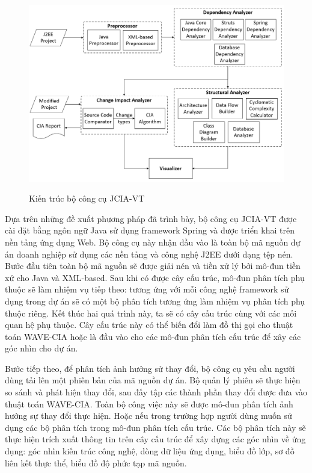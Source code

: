 \documentclass[12pt]{report}
\begin{document}
\begin{figure}[h]
	\centering
	\includegraphics[scale=0.7]{jcia-vt-architecture}
	\label{fig:jcia-vt-architecture}
	\caption{Kiến trúc bộ công cụ JCIA-VT}
\end{figure}

Dựa trên những đề xuất phương pháp đã trình bày, bộ công cụ JCIA-VT được cài đặt bằng ngôn ngữ Java sử dụng framework Spring và được triển khai trên nền tảng ứng dụng Web. Bộ công cụ này nhận đầu vào là toàn bộ mã nguồn dự án doanh nghiệp sử dụng các nền tảng và công nghệ J2EE dưới dạng tệp nén. Bước đầu tiên toàn bộ mã nguồn sẽ được giải nén và tiền xử lý bởi mô-đun tiền xử cho Java và XML-based. Sau khi có được cây cấu trúc, mô-đun phân tích phụ thuộc sẽ làm nhiệm vụ tiếp theo: tương ứng với mỗi công nghệ framework sử dụng trong dự án sẽ có một bộ phân tích tương ứng làm nhiệm vụ phân tích phụ thuộc riêng. Kết thúc hai quá trình này, ta sẽ có cây cấu trúc cùng với các mối quan hệ phụ thuộc. Cây cấu trúc này có thể biến đổi làm đồ thị gọi cho thuật toán WAVE-CIA hoặc là đầu vào cho các mô-đun phân tích cấu trúc để xây các góc nhìn cho dự án.

Bước tiếp theo, để phân tích ảnh hưởng sử thay đổi, bộ công cụ yêu cầu người dùng tải lên một phiên bản của mã nguồn dự án. Bộ quản lý phiên sẽ thực hiện so sánh và phát hiện thay đổi, sau đấy tập các thành phần thay đổi được đưa vào thuật toán WAVE-CIA. Toàn bộ công việc này sẽ được mô-đun phân tích ảnh hưởng sự thay đổi thực hiện. Hoặc nếu trong trường hợp người dùng muốn sử dụng các bộ phân tích trong mô-đun phân tích cấu trúc. Các bộ phân tích này sẽ thực hiện trích xuất thông tin trên cây cấu trúc để xây dựng các góc nhìn về ứng dụng: góc nhìn kiến trúc công nghệ, dòng dữ liệu ứng dụng, biểu đồ lớp, sơ đồ liên kết thực thể, biểu đồ độ phức tạp mã nguồn.
\end{document}
